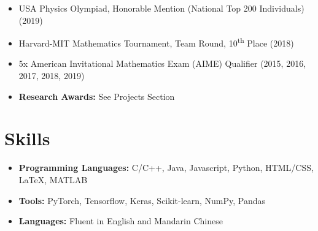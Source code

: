 \documentclass[letterpaper,11pt]{article}
\newcommand{\myitem}[1]{\item #1 \vspace{-9pt}}
\newcommand{\mysubitem}[1]{\item #1 \vspace{-4pt}}
\begin{document}
\begin{itemize}[leftmargin=*]
	\myitem{USA Physics Olympiad, Honorable Mention (National Top 200 Individuals) (2019)}
	\myitem {Harvard-MIT Mathematics Tournament, Team Round, 10\textsuperscript{th} Place (2018)}
	\myitem {5x American Invitational Mathematics Exam (AIME) Qualifier (2015, 2016, 2017, 2018, 2019)}
		
			

	\myitem {\textbf{Research Awards:} See Projects Section}
\end{itemize}
\vspace{2pt}

\section{Skills}
	\begin{itemize}[leftmargin=*]
		\myitem {\textbf{Programming Languages:} C/C++, Java, Javascript, Python, HTML/CSS, \LaTeX, MATLAB}
		\myitem {\textbf{Tools:} PyTorch, Tensorflow, Keras, Scikit-learn, NumPy, Pandas}
		\myitem {\textbf{Languages:} Fluent in English and Mandarin Chinese}
	\end{itemize}
\end{document}
